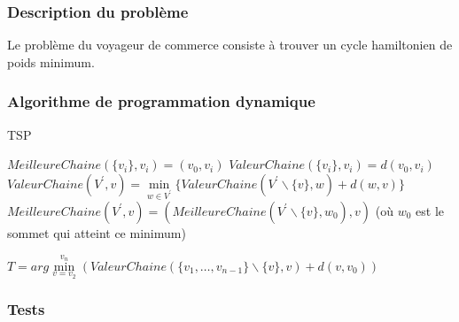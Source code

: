 \subsubsection{Description du problème}
Le problème du voyageur de commerce consiste à trouver un cycle hamiltonien de poids minimum.

\subsubsection{Algorithme de programmation dynamique}

\begin{algorithm}[H]
	\caption{TSP}
	\begin{algorithmic}[1]
			\STATE $MeilleureChaine(\{v_i\},v_i) = (v_0, v_i)$
			\STATE $ValeurChaine(\{v_i\},v_i) = d(v_0, v_i)$
		\ENDFOR
					\STATE $ValeurChaine(V^{'},v) = \min\limits_{w \in V^{'}}\{ValeurChaine(V^{'}\backslash \{v\},w)+d(w,v)\}$
					\STATE $MeilleureChaine(V^{'},v) = (MeilleureChaine(V^{'}\backslash \{v\},w_0),v)$ (où $w_0$ est le sommet qui atteint ce minimum)
				\ENDFOR
			\ENDFOR
		\ENDFOR
		
		\RETURN $T=arg \min\limits_{v=v_2}^{v_n}(ValeurChaine(\{v_1,\ldots,v_{n-1}\}\backslash \{v\},v)+d(v,v_0))$
	\end{algorithmic}
\end{algorithm}


\subsubsection{Tests}


